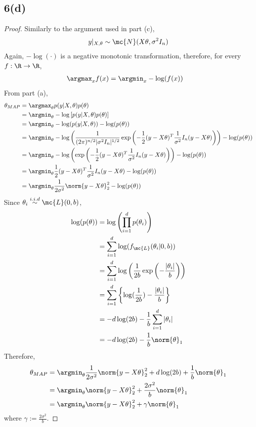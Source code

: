\documentclass[11pt]{article}
\begin{document}
	\newpage
	\subsection{6(d)}
	\begin{proof}
		Similarly to the argument used in part (c), 
		\begin{align}
			y|_{X, \theta} \sim \mc{N}(X \theta, \sigma^2 I_n)
		\end{align}
		Again, $-\log(\cdot)$ is a negative monotonic transformation, therefore, for every $f: \R \to \R$,
		\begin{align}
			\argmax_x f(x) &= \argmin_x - \log(f(x))
		\end{align}
		From part (a),
		\begin{align}
			\theta_{MAP} &= \argmax_\theta p(y|X, \theta) p(\theta) \\
			&= \argmin_\theta -\log \left[p(y|X, \theta) p(\theta)\right] \\
			&= \argmin_\theta -\log(p(y|X, \theta)) - \log(p(\theta)) \\
			&= \argmin_\theta -\log \left (
			\frac{1}{(2\pi)^{n/2} |\sigma^2 I_n|^{1/2}}
			\exp \left(
			-\frac{1}{2} (y - X\theta)^T \frac{1}{\sigma^2} I_n (y - X\theta)
			\right)
			\right) - \log(p(\theta)) \\
			&= \argmin_\theta -\log \left (\exp \left(
			-\frac{1}{2} (y - X\theta)^T \frac{1}{\sigma^2} I_n (y - X\theta)
			\right)
			\right) - \log(p(\theta)) \\
			&= \argmin_\theta \frac{1}{2} (y - X\theta)^T \frac{1}{\sigma^2} I_n (y - X\theta) - \log(p(\theta)) \\
			&= \argmin_\theta \frac{1}{2 \sigma^2} \norm{y - X\theta}^2_2 - \log(p(\theta))
		\end{align}
		Since $\theta_i \overset{i.i.d}{\sim} \mc{L}(0, b)$, 
		\begin{align}
			\log(p(\theta)) &= \log \left( \prod_{i=1}^d p(\theta_i) \right) \\
			&= \sum_{i=1}^d \log(f_{\mc{L}} (\theta_i|0, b)) \\
			&= \sum_{i=1}^d \log\left(\frac{1}{2b} \exp \left(- \frac{|\theta_i|}{b} \right) \right) \\
			&= \sum_{i=1}^d \left \{
			\log(\frac{1}{2b}) - \frac{|\theta_i|}{b}
			\right \} \\
			&= -d\log(2b) - \frac{1}{b} \sum_{i=1}^d |\theta_i| \\
			&= -d\log(2b) - \frac{1}{b} \norm{\theta}_1
		\end{align}
		Therefore,
		\begin{align}
			\theta_{MAP} &= \argmin_\theta \frac{1}{2\sigma^2} \norm{y - X\theta}_2^2 + d \log(2b) + \frac{1}{b} \norm{\theta}_1 \\
			&= \argmin_\theta \norm{y - X\theta}_2^2 + \frac{2\sigma^2}{b} \norm{\theta}_1 \\
			&= \argmin_\theta \norm{y - X\theta}_2^2 + \gamma \norm{\theta}_1
		\end{align}
		where $\gamma := \frac{2\sigma^2}{b}$.
	\end{proof}
\end{document}
